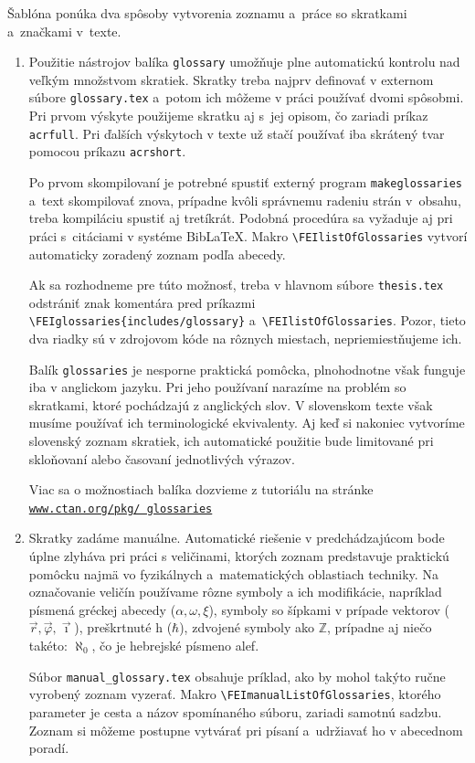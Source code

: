 Šablóna ponúka dva spôsoby vytvorenia zoznamu a~práce so skratkami a~značkami v~texte.
\begin{enumerate}
\item Použitie nástrojov balíka \verb|glossary| umožňuje plne automatickú kontrolu nad veľkým množstvom skratiek. Skratky treba najprv definovať v externom súbore \verb|glossary.tex| a~potom ich môžeme v práci používať dvomi spôsobmi. Pri prvom výskyte použijeme skratku aj s~jej opisom, čo zariadi príkaz \verb|acrfull|. 
Pri ďalších výskytoch v texte už stačí používať iba skrátený tvar pomocou príkazu \verb|acrshort|.

Po prvom skompilovaní je potrebné spustiť externý program \verb|makeglossaries| a~text skompilovať znova, prípadne kvôli správnemu radeniu strán v~obsahu, treba kompiláciu spustiť aj tretíkrát.
Podobná procedúra sa vyžaduje aj pri práci s~citáciami v systéme Bib\LaTeX.
Makro \verb|\FEIlistOfGlossaries| vytvorí automaticky zoradený zoznam  podľa abecedy.

Ak sa rozhodneme pre túto možnosť,
treba v hlavnom súbore \verb|thesis.tex| odstrániť
znak komentára pred príkazmi \verb|\FEIglossaries{includes/glossary}|
a~\verb|\FEIlistOfGlossaries|. Pozor, tieto dva riadky sú v zdrojovom kóde na rôznych miestach, nepriemiestňujeme ich.

Balík \verb|glossaries| je nesporne praktická pomôcka, plnohodnotne však funguje iba v anglickom jazyku.
Pri jeho používaní narazíme na problém so skratkami, ktoré pochádzajú z anglických slov.
V slovenskom texte však musíme používať ich terminologické ekvivalenty.
Aj keď si nakoniec vytvoríme slovenský zoznam skratiek, ich automatické použitie bude limitované pri skloňovaní alebo časovaní jednotlivých výrazov.

Viac sa o možnostiach balíka dozvieme z tutoriálu na stránke \href{https://www.ctan.org/pkg/glossaries}{\texttt{www.ctan.org/pkg/ glossaries}}

\item Skratky zadáme manuálne.
Automatické riešenie v predchádzajúcom bode úplne zlyháva pri práci s veličinami, ktorých zoznam predstavuje praktickú pomôcku najmä vo fyzikálnych a~matematických oblastiach techniky. Na označovanie veličín používame rôzne symboly a ich modifikácie, napríklad písmená gréckej abecedy ($\alpha, \omega, \xi$), symboly so šípkami v prípade vektorov ($\vec r, \vec\varphi, \vec\imath$), preškrtnuté h ($\hbar$), zdvojené symboly ako $\mathbb Z$, prípadne aj niečo takéto: $\aleph_0$, čo je hebrejské písmeno alef.

Súbor \verb|manual_glossary.tex| obsahuje príklad, ako by mohol takýto ručne vyrobený zoznam vyzerať.
Makro 
\verb|\FEImanualListOfGlossaries|, ktorého parameter je cesta a názov spomínaného súboru, zariadi samotnú sadzbu.
Zoznam si môžeme postupne vytvárať pri písaní a~udržiavať ho v abecednom poradí.
\end{enumerate}

